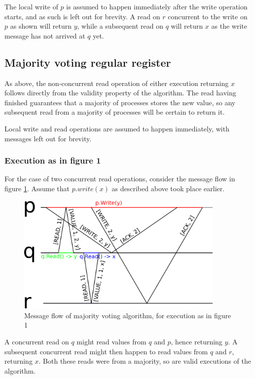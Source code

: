 \documentclass[a4paper]{scrreprt}
\begin{document}
The local write of $p$ is assumed to happen immediately after the write
operation starts, and as such is left out for brevity. A read on $r$ concurrent
to the write on $p$ as shown will return $y$, while a subsequent read on $q$
will return $x$ as the write message has not arrived at $q$ yet.

\subsection{Majority voting regular register}

As above, the non-concurrent read operation of either execution returning $x$
follows directly from the validity property of the algorithm. The read having
finished guarantees that a majority of processes stores the new value, so any
subsequent read from a majority of processes will be certain to return it.

Local write and read operations are assumed to happen immediately, with
messages left out for brevity.

\subsubsection{Execution as in figure 1}

For the case of two concurrent read operations, consider the message flow in
figure \ref{fig:majority_voting}. Assume that $p.write(x)$ as described above
took place earlier.

\begin{figure}[h]
    \centering
    \includegraphics[width=0.9\textwidth]{res/5_1_b.png}
    \caption{Message flow of majority voting algorithm, for execution as in figure 1}
    \label{fig:majority_voting}
\end{figure}

A concurrent read on $q$ might read values from $q$ and $p$, hence returning
$y$. A subsequent concurrent read might then happen to read values from $q$ and
$r$, returning $x$. Both these reads were from a majority, so are valid
executions of the algorithm.
\end{document}
